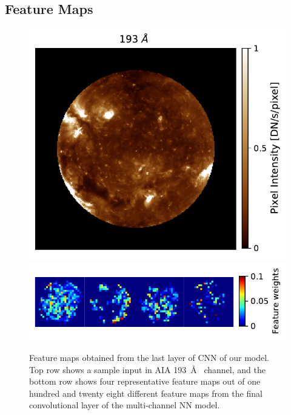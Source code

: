 \documentclass{aa}
\begin{document}
\subsection{Feature Maps}
    \label{sec:feature-maps}
    
\begin{figure} [h!]
  \centering
  \includegraphics[width=0.8\linewidth]{reference.pdf}
  \includegraphics[width=\linewidth]{latent.pdf}
  \caption{Feature maps obtained from the last layer of CNN of our model. Top row shows a sample input in AIA 193~\AA~ channel, and the bottom row shows four representative feature maps out of one hundred and twenty eight different feature maps from the final convolutional layer of the multi-channel NN model.}
  \label{fig:autocalibrate_activation_viz}
\end{figure}
\end{document}
